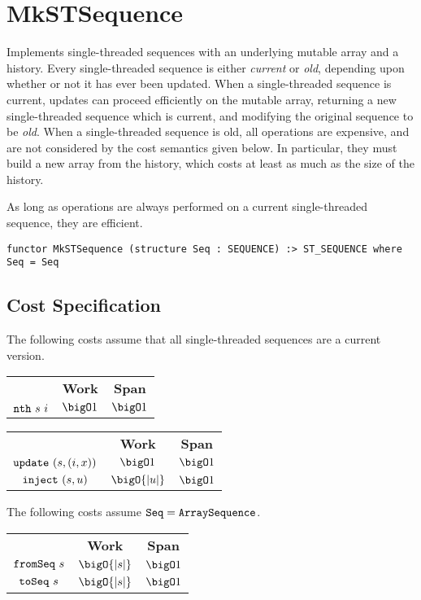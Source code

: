 \chapter{MkSTSequence}
\label{ch:st-seq}
\begin{preamble}
Implements single-threaded sequences with an underlying mutable array and a
history.
Every single-threaded sequence is either \emph{current} or \emph{old},
depending upon whether or not it has ever been updated.
When a single-threaded sequence is current, updates can proceed efficiently
on the mutable array, returning a new single-threaded sequence which is
current, and modifying the original sequence to be \emph{old}.
When a single-threaded sequence is old, all operations are expensive, and
are not considered by the cost semantics given below. In particular, they
must build a new array from the history, which costs at least as much as the
size of the history.

As long as operations are always performed on a current
single-threaded sequence, they are efficient.
\begin{verbatim}
functor MkSTSequence (structure Seq : SEQUENCE) :> ST_SEQUENCE where Seq = Seq
\end{verbatim}
\end{preamble}

\section{Cost Specification}

\begin{gram}
The following costs assume that all single-threaded sequences are a current
version.
\end{gram}

\begin{costspec}[Indexing]
\begin{tabular}{ccc}
& \textbf{Work} & \textbf{Span} \\
$\texttt{nth}~s~i$ & $\bigO 1$ & $\bigO 1$
\end{tabular}
\end{costspec}

\begin{costspec}[Updates]
\begin{tabular}{ccc}
& \textbf{Work} & \textbf{Span} \\
$\texttt{update}~(s,(i,x))$ & $\bigO 1$ & $\bigO 1$ \\
$\texttt{inject}~(s,u)$ & $\bigO{|u|}$ & $\bigO 1$
\end{tabular}
\end{costspec}

\begin{costspec}[Conversion]
The following costs assume $\texttt{Seq} = \texttt{ArraySequence}$.
\begin{tabular}{ccc}
& \textbf{Work} & \textbf{Span} \\
$\texttt{fromSeq}~s$ & $\bigO{|s|}$ & $\bigO 1$ \\
$\texttt{toSeq}~s$ & $\bigO{|s|}$ & $\bigO 1$
\end{tabular}
\end{costspec}

